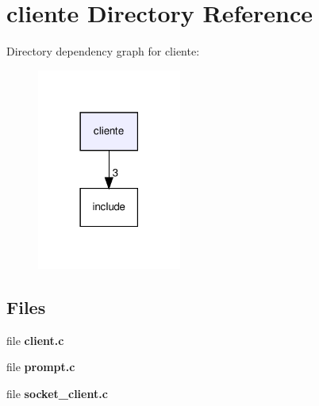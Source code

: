 \section{cliente Directory Reference}
\label{dir_ee23875512b03122aad1d4f8be53eb59}
Directory dependency graph for cliente\+:
\nopagebreak
\begin{figure}[H]
\begin{center}
\leavevmode
\includegraphics[width=134pt]{dir_ee23875512b03122aad1d4f8be53eb59_dep}
\end{center}
\end{figure}
\subsection*{Files}
\begin{DoxyCompactItemize}
\item 
file \textbf{ client.\+c}
\item 
file \textbf{ prompt.\+c}
\item 
file \textbf{ socket\+\_\+client.\+c}
\end{DoxyCompactItemize}
